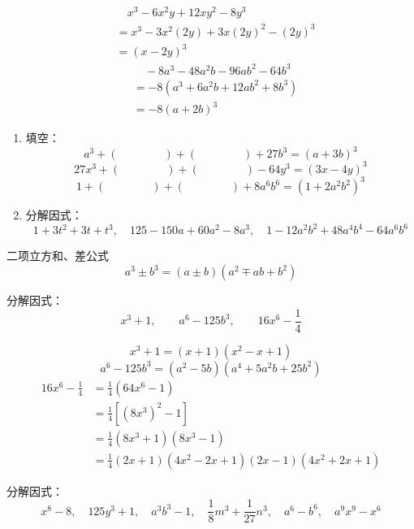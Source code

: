 \begin{solution}
\[\begin{split}
      &\quad       x^3-6x^2y+12xy^2-8y^3\\
      &=x^3-3x^2(2y)+3x(2y)^2-(2y)^3\\
      &=(x-2y)^3
        \end{split}\]
 \[\begin{split}
            &\quad -8a^3-48a^2b-96ab^2-64b^3\\
&=-8(a^3+6a^2b+12ab^2+8b^3)\\
&=-8(a+2b)^3
        \end{split}\]
  
\end{solution}

\begin{ex}
\begin{enumerate}
    \item 填空：
    \[a^3+(\qquad \qquad)+(\qquad\qquad )+27b^3=(a+3b)^3\]
    \[27x^3+(\qquad\qquad)+(\qquad\qquad )-64y^3=(3x-4y)^3\]
    \[1+(\qquad\qquad)+(\qquad\qquad)+8a^6b^6=(1+2a^2b^2)^3\]

\item 分解因式：
\[1+3t^2+3t+t^3,\quad 125-150a+60a^2-8a^3,\quad 1-12a^2b^2+48a^4b^4-64a^6b^6\]
\end{enumerate}    
\end{ex}

\begin{blk}{二项立方和、差公式}
    \[a^3\pm b^3 =(a\pm b)(a^2\mp ab+b^2)\]
\end{blk}

\begin{example}
分解因式：
\[x^3+1,\qquad a^6-125b^3,\qquad 16x^6-\frac{1}{4}\]
\end{example}

\begin{solution}
\[x^3+1=(x+1)(x^2-x+1)\]
\[a^6-125b^3=(a^2-5b)(a^4+5a^2b+25b^2)\]
\[\begin{split}
    16x^6-\frac{1}{4}&=\frac{1}{4}(64x^6-1)\\
    &=\frac{1}{4}\left[(8x^3)^2-1\right]\\
    &=\frac{1}{4}(8x^3+1)(8x^3-1)\\
    &=\frac{1}{4}(2x+1)(4x^2-2x+1)(2x-1)(4x^2+2x+1)
\end{split}\]
\end{solution}

\begin{ex}
    分解因式：
\[x^8-8,\quad 125y^3+1,\quad  a^3b^3-1,\quad \frac{1}{8}m^3+\frac{1}{27}n^3,\quad a^6-b^6,\quad a^9x^9-x^6\]
\end{ex}

